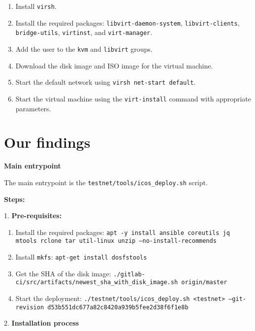 \begin{enumerate}
    \item Install \texttt{virsh}.
    \item Install the required packages: \texttt{libvirt-daemon-system}, \texttt{libvirt-clients}, \texttt{bridge-utils}, \texttt
    {virtinst}, and \texttt{virt-manager}.
    \item Add the user to the \texttt{kvm} and \texttt{libvirt} groups.
    \item Download the disk image and ISO image for the virtual machine.
    \item Start the default network using \texttt{virsh net-start default}.
    \item Start the virtual machine using the \texttt{virt-install} command with appropriate parameters.
\end{enumerate}

\section{Our findings}

\textbf{Main entrypoint}

The main entrypoint is the \texttt{testnet/tools/icos\_deploy.sh} script.

\textbf{Steps:}

1. \textbf{Pre-requisites:}
    \begin{enumerate}
        \item Install the required packages:
        \texttt{apt -y install ansible coreutils jq mtools rclone tar util-linux unzip --no-install-recommends}
        \item Install \texttt{mkfs}:
        \texttt{apt-get install dosfstools}
        \item Get the SHA of the disk image:
        \texttt{./gitlab-ci/src/artifacts/newest\_sha\_with\_disk\_image.sh origin/master}
        \item Start the deployment:
        \texttt{./testnet/tools/icos\_deploy.sh <testnet> --git-revision d53b551dc677a82c8420a939b5fee2d38f6f1e8b}
    \end{enumerate}

2. \textbf{Installation process}
    
